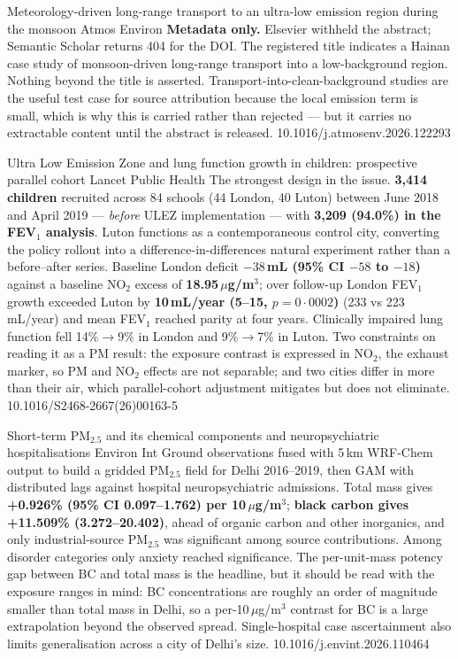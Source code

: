 \documentclass[10pt]{article}
\begin{document}
{Meteorology-driven long-range transport to an ultra-low emission region during the monsoon}
{Atmos Environ}
{\textbf{Metadata only.} Elsevier withheld the abstract; Semantic Scholar returns 404 for
the DOI. The registered title indicates a Hainan case study of monsoon-driven long-range
transport into a low-background region. Nothing beyond the title is asserted.
Transport-into-clean-background studies are the useful test case for source attribution
because the local emission term is small, which is why this is carried rather than
rejected --- but it carries no extractable content until the abstract is released.}
{10.1016/j.atmosenv.2026.122293}


{Ultra Low Emission Zone and lung function growth in children: prospective parallel cohort}
{Lancet Public Health}
{The strongest design in the issue. \textbf{3,414 children} recruited across 84 schools
(44 London, 40 Luton) between June 2018 and April 2019 --- \emph{before} ULEZ implementation
--- with \textbf{3,209 (94.0\%) in the FEV$_1$ analysis}. Luton functions as a
contemporaneous control city, converting the policy rollout into a difference-in-differences
natural experiment rather than a before--after series. Baseline London deficit
\textbf{$-38$\,mL (95\% CI $-58$ to $-18$)} against a baseline NO$_2$ excess of
\textbf{18.95\,$\mu$g/m$^3$}; over follow-up London FEV$_1$ growth exceeded Luton by
\textbf{10\,mL/year (5--15, $p=0{\cdot}0002$)} (233 vs 223\,mL/year) and mean FEV$_1$
reached parity at four years. Clinically impaired lung function fell 14\%$\to$9\% in
London and 9\%$\to$7\% in Luton. Two constraints on reading it as a PM result: the
exposure contrast is expressed in NO$_2$, the exhaust marker, so PM and NO$_2$ effects are
not separable; and two cities differ in more than their air, which parallel-cohort
adjustment mitigates but does not eliminate.}
{10.1016/S2468-2667(26)00163-5}


{Short-term PM$_{2.5}$ and its chemical components and neuropsychiatric hospitalisations}
{Environ Int}
{Ground observations fused with 5\,km WRF-Chem output to build a gridded PM$_{2.5}$ field
for Delhi 2016--2019, then GAM with distributed lags against hospital neuropsychiatric
admissions. Total mass gives \textbf{+0.926\% (95\% CI 0.097--1.762) per 10\,$\mu$g/m$^3$};
\textbf{black carbon gives +11.509\% (3.272--20.402)}, ahead of organic carbon and other
inorganics, and only industrial-source PM$_{2.5}$ was significant among source
contributions. Among disorder categories only anxiety reached significance. The
per-unit-mass potency gap between BC and total mass is the headline, but it should be read
with the exposure ranges in mind: BC concentrations are roughly an order of magnitude
smaller than total mass in Delhi, so a per-10\,$\mu$g/m$^3$ contrast for BC is a large
extrapolation beyond the observed spread. Single-hospital case ascertainment also limits
generalisation across a city of Delhi's size.}
{10.1016/j.envint.2026.110464}
\end{document}
